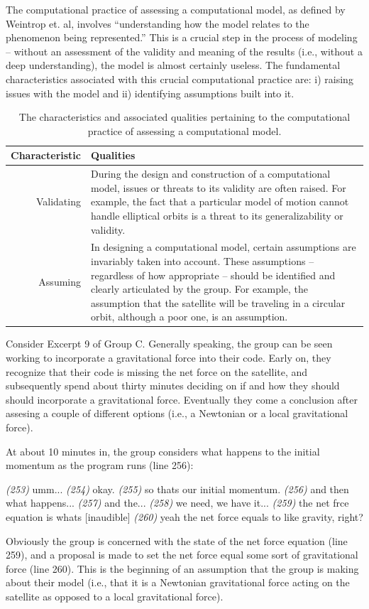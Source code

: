 \documentclass{msuphddissertation}
\begin{document}
\begin{doublespace}
The computational practice of assessing a computational model, as defined by Weintrop et. al, involves ``understanding how the model relates to the phenomenon being represented.''  This is a crucial step in the process of modeling -- without an assessment of the validity and meaning of the results (i.e., without a deep understanding), the model is almost certainly useless.  The fundamental characteristics associated with this crucial computational practice are: i) raising issues with the model and ii) identifying assumptions built into it.

\begin{table}
\begin{tabular}{r|p{}}
Characteristic & Qualities \\\hline\hline
Validating & During the design and construction of a computational model, issues or threats to its validity are often raised.  For example, the fact that a particular model of motion cannot handle elliptical orbits is a threat to its generalizability or validity.\\
Assuming & In designing a computational model, certain assumptions are invariably taken into account.  These assumptions -- regardless of how appropriate -- should be identified and clearly articulated by the group.  For example, the assumption that the satellite will be traveling in a circular orbit, although a poor one, is an assumption.\\
\end{tabular}\caption{The characteristics and associated qualities pertaining to the computational practice of assessing a computational model.}
\end{table}

Consider Excerpt 9 of Group C.  Generally speaking, the group can be seen working to incorporate a gravitational force into their code.  Early on, they recognize that their code is missing the net force on the satellite, and subsequently spend about thirty minutes deciding on if and how they should should incorporate a gravitational force.  Eventually they come a conclusion after assesing a couple of different options (i.e., a Newtonian or a local gravitational force).

At about 10 minutes in, the group considers what happens to the initial momentum as the program runs (line 256):
\begin{description}
\SA \textit{(253)} umm...
\SB	\textit{(254)} okay.
\SA \textit{(255)} so thats our initial momentum.			
\SA \textit{(256)} and then what happens...			
\SD \textit{(257)} and the...
\SA \textit{(258)} we need, we have it...		
\SA \textit{(259)} the net frce equation is whats [inaudible]			
\SD \textit{(260)} yeah the net force equals to like gravity, right?\end{description}  Obviously the group is concerned with the state of the net force equation (line 259), and a proposal is made to set the net force equal some sort of gravitational force (line 260).  This is the beginning of an assumption that the group is making about their model (i.e., that it is a Newtonian gravitational force acting on the satellite as opposed to a local gravitational force).


\end{doublespace}
\end{document}
